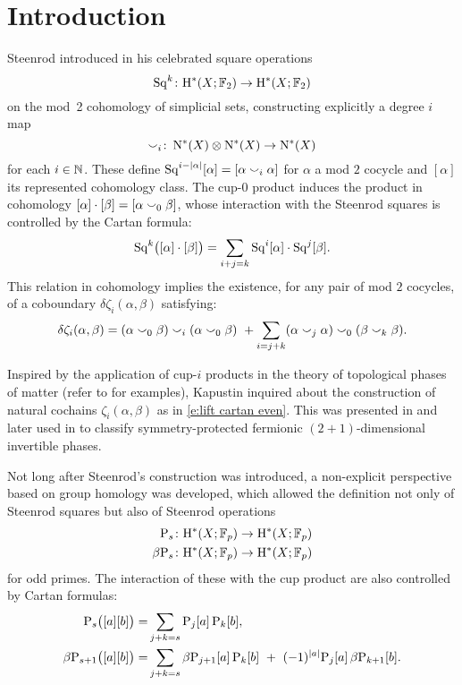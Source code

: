 
\section{Introduction} \label{s:introduction}

\noindent Steenrod introduced in \cite{steenrod1947products} his celebrated square operations
\[
\operatorname{Sq}^k \colon \mathrm{H}^*(X; {\mathbb{F}_2}) \to \mathrm{H}^*(X; {\mathbb{F}_2})
\]
on the mod~2 cohomology of simplicial sets, constructing explicitly a degree $i$ map
\[
\smallsmile_i \colon \operatorname{N^{\ast}}(X) \otimes \operatorname{N^{\ast}}(X) \to \operatorname{N^{\ast}}(X)
\]
for each $i \in \mathbb{N}$.
These define $\operatorname{Sq}^{i-\lvert\alpha\rvert}[\alpha] = [\alpha \smallsmile_i \alpha]$ for $\alpha$ a mod $2$ cocycle and $[\alpha]$ its represented cohomology class.
The cup-$0$ product induces the product in cohomology $[\alpha] \cdot [\beta] = [\alpha \smallsmile_0 \beta]$, whose interaction with the Steenrod squares is controlled by the Cartan formula:
\[
\operatorname{Sq}^k\!\big([\alpha] \cdot [\beta]\big) = \sum_{i+j=k} \operatorname{Sq}^i [\alpha] \cdot \operatorname{Sq}^j[\beta].
\]
This relation in cohomology implies the existence, for any pair of mod $2$ cocycles, of a coboundary $\delta\zeta_i(\alpha,\beta)$ satisfying:
\begin{equation}\label{e:lift cartan even}
	\delta\zeta_i(\alpha, \beta) =
	(\alpha \smallsmile_0 \beta) \smallsmile_i (\alpha \smallsmile_0 \beta) \ +
	\sum_{i=j+k} (\alpha \smallsmile_j \alpha) \smallsmile_0 (\beta \smallsmile_k \beta).
\end{equation}

Inspired by the application of cup-$i$ products in the theory of topological phases of matter (refer to \cite{kapustin2015cobordism, gaiotto2016spin, kapustin2017fermionic} for examples), Kapustin inquired about the construction of natural cochains $\zeta_i(\alpha, \beta)$ as in \eqref{e:lift cartan even}.
This was presented in \cite{medina2020cartan} and later used in \cite{barkeshli2021classification} to classify symmetry-protected fermionic $(2+1)$-dimensional invertible phases.

Not long after Steenrod's construction was introduced, a non-explicit perspective based on group homology was developed, which allowed the definition not only of Steenrod squares but also of Steenrod operations
\begin{align*}
	\mathrm{P}_s \colon& \mathrm{H}^*(X; {\mathbb{F}_p}) \to \mathrm{H}^*(X; {\mathbb{F}_p}) \\
	\beta \mathrm{P}_s \colon& \mathrm{H}^*(X; {\mathbb{F}_p}) \to \mathrm{H}^*(X; {\mathbb{F}_p})
\end{align*}
for odd primes.
The interaction of these with the cup product are also controlled by Cartan formulas:
\begin{align*}
	\mathrm{P}_{s}\big([a][b]\big) =&
	\sum_{j+k=s} \mathrm{P}_j[a] \, \mathrm{P}_k[b], \\
	\beta \mathrm{P}_{s+1}\big([a][b]\big) =&
	\sum_{j+k=s} \beta \mathrm{P}_{j+1}[a] \, \mathrm{P}_k[b] \ +\ (-1)^{\lvert a\rvert} \mathrm{P}_j[a] \, \beta \mathrm{P}_{k+1}[b].
\end{align*}

